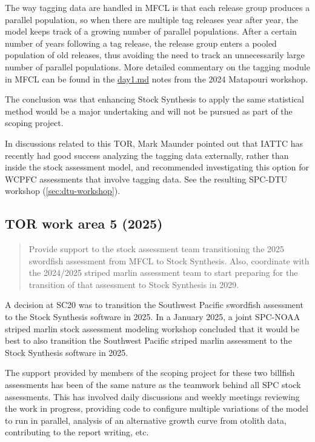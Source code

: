 \documentclass{SCreport}
\newcommand\blob
{https://github.com/PacificCommunity/ofp-sam-transition-plan/blob/main}
\begin{document}
The way tagging data are handled in MFCL is that each release group produces a
parallel population, so when there are multiple tag releases year after year,
the model keeps track of a growing number of parallel populations. After a
certain number of years following a tag release, the release group enters a
pooled population of old releases, thus avoiding the need to track an
unnecessarily large number of parallel populations. More detailed commentary on
the tagging module in MFCL can be found in the
\href{\blob/workshops/2024-08-matapouri/notes/day1.md}{day1.md} notes from the
2024 Matapouri workshop.

The conclusion was that enhancing Stock Synthesis to apply the same statistical
method would be a major undertaking and will not be pursued as part of the
scoping project.

In discussions related to this TOR, Mark Maunder pointed out that IATTC has
recently had good success analyzing the tagging data externally, rather than
inside the stock assessment model, and recommended investigating this option for
WCPFC assessments that involve tagging data. See the resulting SPC-DTU workshop
(\autoref{sec:dtu-workshop}).

\vspace{2ex}

\subsection{TOR work area 5 (2025)}

\begin{quote}\sf
  Provide support to the stock assessment team transitioning the 2025 swordfish
  assessment from MFCL to Stock Synthesis. Also, coordinate with the 2024/2025
  striped marlin assessment team to start preparing for the transition of that
  assessment to Stock Synthesis in 2029.
\end{quote}

\vspace{1ex}

A decision at SC20 was to transition the Southwest Pacific swordfish assessment
to the Stock Synthesis software in 2025. In a January 2025, a joint SPC-NOAA
striped marlin stock assessment modeling workshop concluded that it would be
best to also transition the Southwest Pacific striped marlin assessment to the
Stock Synthesis software in 2025.

The support provided by members of the scoping project for these two billfish
assessments has been of the same nature as the teamwork behind all SPC stock
assessments. This has involved daily discussions and weekly meetings reviewing
the work in progress, providing code to configure multiple variations of the
model to run in parallel, analysis of an alternative growth curve from otolith
data, contributing to the report writing, etc.
\end{document}
